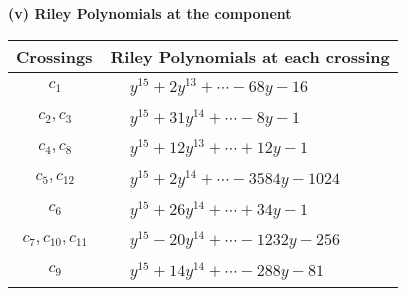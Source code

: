 \documentclass[1p]{elsarticle_modified}
\theoremstyle{definition}
\begin{document}
\flushleft \textbf{(v) Riley Polynomials at the component}\newline \\
\begin{tabular}{m{50pt}|m{274pt}}
Crossings & \hspace{64pt}Riley Polynomials at each crossing \\
\hline $$\begin{aligned}c_{1}\end{aligned}$$&$\begin{aligned}
&y^{15}+2 y^{13}+\cdots-68 y-16
\end{aligned}$\\
\hline $$\begin{aligned}c_{2},c_{3}\end{aligned}$$&$\begin{aligned}
&y^{15}+31 y^{14}+\cdots-8 y-1
\end{aligned}$\\
\hline $$\begin{aligned}c_{4},c_{8}\end{aligned}$$&$\begin{aligned}
&y^{15}+12 y^{13}+\cdots+12 y-1
\end{aligned}$\\
\hline $$\begin{aligned}c_{5},c_{12}\end{aligned}$$&$\begin{aligned}
&y^{15}+2 y^{14}+\cdots-3584 y-1024
\end{aligned}$\\
\hline $$\begin{aligned}c_{6}\end{aligned}$$&$\begin{aligned}
&y^{15}+26 y^{14}+\cdots+34 y-1
\end{aligned}$\\
\hline $$\begin{aligned}c_{7},c_{10},c_{11}\end{aligned}$$&$\begin{aligned}
&y^{15}-20 y^{14}+\cdots-1232 y-256
\end{aligned}$\\
\hline $$\begin{aligned}c_{9}\end{aligned}$$&$\begin{aligned}
&y^{15}+14 y^{14}+\cdots-288 y-81
\end{aligned}$\\
\hline
\end{tabular}\\~\\
\end{document}
